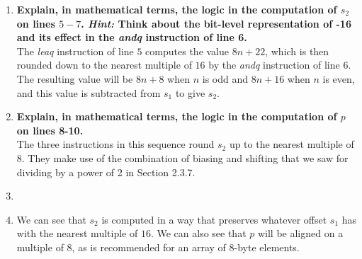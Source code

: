 \documentclass{article}
\begin{document}
\begin{enumerate}[label=\textbf{\Alph*.}]
	\item \textbf{Explain, in mathematical terms, the logic in the computation of $s_2$ on lines
	$5-7$. \textit{Hint:} Think about the bit-level representation of -16 and its effect
	in the \textit{andq} instruction of line 6.} \\
	The \textit{leaq} instruction of line $5$ computes the value $8n+22$, which is
	then rounded down to the nearest multiple of $16$ by the \textit{andq} instruction of line $6$.
	The resulting value will be $8n+8$ when $n$ is odd and $8n+16$ when $n$ is even,
	and this value is subtracted from $s_1$ to give $s_2$.
	\item \textbf{Explain, in mathematical terms, the logic in the computation of $p$ on lines 
	8-10.} \\
	The three instructions in this sequence round $s_2$ up to the nearest
	multiple of $8$. They make use of the combination of biasing and shifting that we
	saw for dividing by a power of 2 in Section 2.3.7. \\
	\item
	\item 
	We can see that $s_2$ is computed in a way that preserves whatever offset $s_1$ has
	with the nearest multiple of $16$. We can also see that $p$ will be aligned on
	a multiple of $8$, as is recommended for an array of 8-byte elements.
\end{enumerate}
\end{document}
